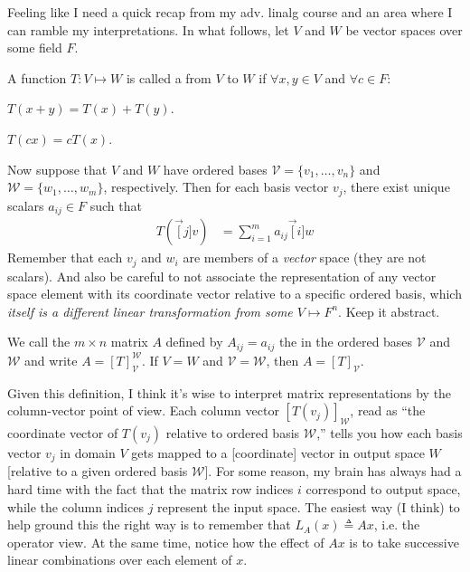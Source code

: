 \documentclass[11pt]{article}
\begin{document}

Feeling like I need a quick recap from my adv. linalg course and an area where I can ramble my interpretations. In what follows, let $V$ and $W$ be vector spaces over some field $F$.

\begin{definition}
	A function $T: V \mapsto W$ is called a  from $V$ to $W$ if $\forall x,y \in V$ and $\forall c \in F$:
	\begin{compactitem}
		\item $T(x + y) = T(x) + T(y)$. 
		\item $T(cx) = cT(x)$. 
	\end{compactitem}
\end{definition}
Now suppose that $V$ and $W$ have ordered bases $\mathcal V = \{v_1, \ldots, v_n\}$ and $\mathcal W = \{w_1, \ldots, w_m\}$, respectively. Then for each basis vector $v_j$, there exist unique scalars $a_{ij} \in F$ such that
\begin{align}
	T(\vec[j]{v}) &= \sum_{i=1}^m a_{ij} \vec[i]{w} 
\end{align} 
Remember that each $v_j$ and $w_i$ are members of a \textit{vector} space (they are not scalars). And also be careful to not associate the representation of any vector space element with its coordinate vector relative to a specific ordered basis, which \textit{itself is a different linear transformation from some $V \mapsto F^n$}. Keep it abstract.

\begin{definition}
	We call the $m \times n$ matrix $A$ defined by $A_{ij} = a_{ij}$ the  in the ordered bases $\mathcal V$ and $\mathcal W$ and write $A = [T]_{\mathcal V}^{\mathcal W}$. If $V = W$ and $\mathcal V = \mathcal W$, then $A =  [T]_{\mathcal V}$. 
\end{definition}
Given this definition, I think it's wise to interpret matrix representations by the column-vector point of view. Each column vector $[T(v_j)]_{\mathcal W}$, read as ``the coordinate vector of $T(v_j)$ relative to ordered basis $\mathcal W$,'' tells you how each basis vector $v_j$ in domain $V$ gets mapped to a [coordinate] vector in output space $W$ [relative to a given ordered basis $\mathcal W$]. For some reason, my brain has always had a hard time with the fact that the matrix row indices $i$ correspond to output space, while the column indices $j$ represent the input space. The easiest way (I think) to help ground this the right way is to remember that $L_A(x) \triangleq A x$, i.e. the operator view. At the same time, notice how the effect of $Ax$ is to take successive linear combinations over each element of $x$. 
\end{document}
